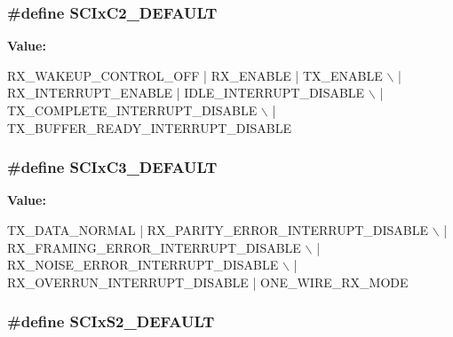 \hypertarget{group__hal__hcs08_gad91bb0f654e9398d1913fb23c872fd9a}{
\subsubsection[{S\-C\-Ix\-C2\-\_\-\-D\-E\-F\-A\-U\-L\-T}]{\setlength{\rightskip}{0pt plus 5cm}\#define S\-C\-Ix\-C2\-\_\-\-D\-E\-F\-A\-U\-L\-T}}\label{group__hal__hcs08_gad91bb0f654e9398d1913fb23c872fd9a}
{\bfseries Value\-:}
\begin{DoxyCode}
RX\_WAKEUP\_CONTROL\_OFF | RX\_ENABLE | TX\_ENABLE \(\backslash\)
            | RX\_INTERRUPT\_ENABLE | IDLE\_INTERRUPT\_DISABLE \(\backslash\)
            | TX\_COMPLETE\_INTERRUPT\_DISABLE \(\backslash\)
            | TX\_BUFFER\_READY\_INTERRUPT\_DISABLE
\end{DoxyCode}
\hypertarget{group__hal__hcs08_ga4e57fc710ca7907c0d9ce9248b50ec67}{
\subsubsection[{S\-C\-Ix\-C3\-\_\-\-D\-E\-F\-A\-U\-L\-T}]{\setlength{\rightskip}{0pt plus 5cm}\#define S\-C\-Ix\-C3\-\_\-\-D\-E\-F\-A\-U\-L\-T}}\label{group__hal__hcs08_ga4e57fc710ca7907c0d9ce9248b50ec67}
{\bfseries Value\-:}
\begin{DoxyCode}
TX\_DATA\_NORMAL | RX\_PARITY\_ERROR\_INTERRUPT\_DISABLE \(\backslash\)
            | RX\_FRAMING\_ERROR\_INTERRUPT\_DISABLE \(\backslash\)
            | RX\_NOISE\_ERROR\_INTERRUPT\_DISABLE \(\backslash\)
            | RX\_OVERRUN\_INTERRUPT\_DISABLE | ONE\_WIRE\_RX\_MODE
\end{DoxyCode}
\hypertarget{group__hal__hcs08_gaf03ceb7e519e6c12ed04a8f600ea217a}{
\subsubsection[{S\-C\-Ix\-S2\-\_\-\-D\-E\-F\-A\-U\-L\-T}]{\setlength{\rightskip}{0pt plus 5cm}\#define S\-C\-Ix\-S2\-\_\-\-D\-E\-F\-A\-U\-L\-T}}\label{group__hal__hcs08_gaf03ceb7e519e6c12ed04a8f600ea217a}
